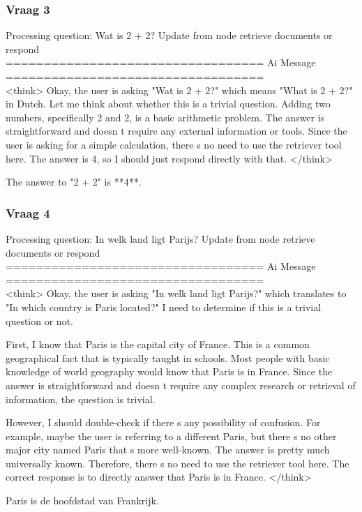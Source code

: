\subsubsection{Vraag 3}
Processing question: Wat is 2 + 2?
Update from node retrieve documents or respond
\\[1em]
================================== Ai Message ==================================
\\[1em]
<think>
Okay, the user is asking "Wat is 2 + 2?" which means "What is 2 + 2?" in Dutch. Let me think about whether this is a trivial question. Adding two numbers, specifically 2 and 2, is a basic arithmetic problem. The answer is straightforward and doesn t require any external information or tools. Since the user is asking for a simple calculation, there s no need to use the retriever tool here. The answer is 4, so I should just respond directly with that.
</think>

The answer to "2 + 2" is **4**.
\subsubsection{Vraag 4}
Processing question: In welk land ligt Parijs?
Update from node retrieve documents or respond
\\[1em]
================================== Ai Message ==================================
\\[1em]
<think>
Okay, the user is asking "In welk land ligt Parijs?" which translates to "In which country is Paris located?" I need to determine if this is a trivial question or not. 

First, I know that Paris is the capital city of France. This is a common geographical fact that is typically taught in schools. Most people with basic knowledge of world geography would know that Paris is in France. Since the answer is straightforward and doesn t require any complex research or retrieval of information, the question is trivial.

However, I should double-check if there s any possibility of confusion. For example, maybe the user is referring to a different Paris, but there s no other major city named Paris that s more well-known. The answer is pretty much universally known. Therefore, there s no need to use the retriever tool here. The correct response is to directly answer that Paris is in France.
</think>

Paris is de hoofdstad van Frankrijk.
